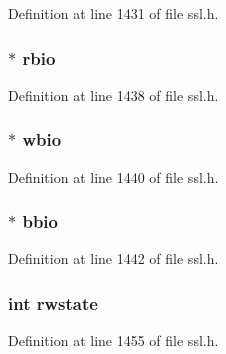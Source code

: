 Definition at line 1431 of file ssl.\+h.

\subsubsection[{\texorpdfstring{rbio}{rbio}}]{ $\ast$ rbio}\hypertarget{structssl__st_aca069ff9c8c6f5d1519091538d18989c}{}\label{structssl__st_aca069ff9c8c6f5d1519091538d18989c}


Definition at line 1438 of file ssl.\+h.

\subsubsection[{\texorpdfstring{wbio}{wbio}}]{ $\ast$ wbio}\hypertarget{structssl__st_a4a0e45c6ce1f547d7b368e2fc85edeef}{}\label{structssl__st_a4a0e45c6ce1f547d7b368e2fc85edeef}


Definition at line 1440 of file ssl.\+h.

\subsubsection[{\texorpdfstring{bbio}{bbio}}]{ $\ast$ bbio}\hypertarget{structssl__st_a42caaceefe4041557f7621c8aedcf57b}{}\label{structssl__st_a42caaceefe4041557f7621c8aedcf57b}


Definition at line 1442 of file ssl.\+h.

\subsubsection[{\texorpdfstring{rwstate}{rwstate}}]{\setlength{\rightskip}{0pt plus 5cm}int rwstate}\hypertarget{structssl__st_a2d687630f01b8b26bcdbd3e39fe7546a}{}\label{structssl__st_a2d687630f01b8b26bcdbd3e39fe7546a}


Definition at line 1455 of file ssl.\+h.

